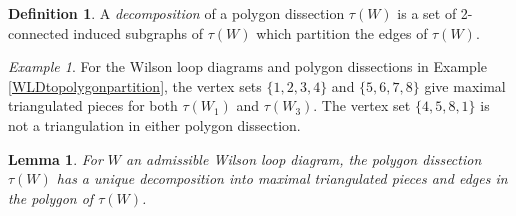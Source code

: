 \documentclass[11pt]{article}
\newtheorem{lem}[thm]{Lemma}
\theoremstyle{remark}
\newtheorem{eg}[thm]{Example}
\theoremstyle{definition}
\newtheorem{dfn}[thm]{Definition}
\begin{document}
\begin{dfn}
 A {\em decomposition} of a polygon dissection $\tau(W)$ is a set of 2-connected induced subgraphs of $\tau(W)$ which partition the edges of $\tau(W)$.  
\end{dfn}

\begin{eg} \label{eg: unique decomposition} For the Wilson loop diagrams and polygon dissections in Example \ref{WLDtopolygonpartition}, the vertex sets $\{1, 2, 3,4\}$ and $\{5, 6, 7, 8\}$ give maximal triangulated pieces for both $\tau(W_1)$ and $\tau(W_3)$. The vertex set $\{4,5, 8, 1\}$ is not a triangulation in either polygon dissection. 
\end{eg}

\begin{lem} \label{decompositionlem}
  For $W$ an admissible Wilson loop diagram, the polygon dissection $\tau(W)$ has a unique decomposition into maximal triangulated pieces and edges in the polygon of $\tau(W)$.
\end{lem}
\end{document}
